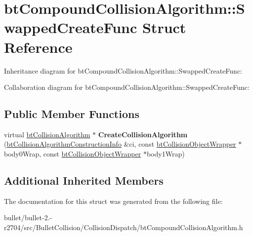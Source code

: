\hypertarget{structbt_compound_collision_algorithm_1_1_swapped_create_func}{\section{bt\+Compound\+Collision\+Algorithm\+:\+:Swapped\+Create\+Func Struct Reference}
\label{structbt_compound_collision_algorithm_1_1_swapped_create_func}
}


Inheritance diagram for bt\+Compound\+Collision\+Algorithm\+:\+:Swapped\+Create\+Func\+:


Collaboration diagram for bt\+Compound\+Collision\+Algorithm\+:\+:Swapped\+Create\+Func\+:
\subsection*{Public Member Functions}
\begin{DoxyCompactItemize}
\item 
\hypertarget{structbt_compound_collision_algorithm_1_1_swapped_create_func_a65e9d68446429525bf4171a79f556b33}{virtual \hyperlink{classbt_collision_algorithm}{bt\+Collision\+Algorithm} $\ast$ {\bfseries Create\+Collision\+Algorithm} (\hyperlink{structbt_collision_algorithm_construction_info}{bt\+Collision\+Algorithm\+Construction\+Info} \&ci, const \hyperlink{structbt_collision_object_wrapper}{bt\+Collision\+Object\+Wrapper} $\ast$body0\+Wrap, const \hyperlink{structbt_collision_object_wrapper}{bt\+Collision\+Object\+Wrapper} $\ast$body1\+Wrap)}\label{structbt_compound_collision_algorithm_1_1_swapped_create_func_a65e9d68446429525bf4171a79f556b33}

\end{DoxyCompactItemize}
\subsection*{Additional Inherited Members}


The documentation for this struct was generated from the following file\+:\begin{DoxyCompactItemize}
\item 
bullet/bullet-\/2.-\/r2704/src/\+Bullet\+Collision/\+Collision\+Dispatch/bt\+Compound\+Collision\+Algorithm.\+h\end{DoxyCompactItemize}
